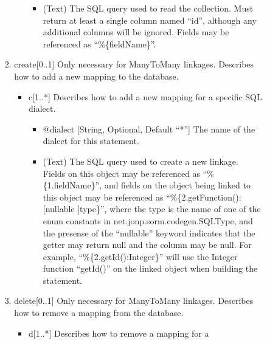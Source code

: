 \documentclass{book}
\begin{document}
\begin{enumerate}
\begin{enumerate}
\begin{enumerate}
\begin{enumerate}
\begin{itemize}
\begin{itemize}
                        \item (Text) The SQL query used to read the collection.
                              Must return at least a single column named ``id'',
                              although any additional columns will be ignored.
                              Fields may be referenced as ``\%\{fieldName\}''.
                    \end{itemize}
                \end{itemize}
                \item create[0..1] Only necessary for ManyToMany linkages.
                      Describes how to add a new mapping to the database.
                \begin{itemize}
                    \item c[1..*] Describes how to add a new mapping for a
                          specific SQL dialect.
                    \begin{itemize}
                        \item @dialect [String, Optional, Default ``*''] The
                              name of the dialect for this statement.
                        \item (Text) The SQL query used to create a new linkage.
                              Fields on this object may be referenced as
                              ``\%\{1.fieldName\}'', and fields on the object
                              being linked to this object may be referenced as
                              ``\%\{2.getFunction():[nullable ]type\}'', where
                              the type is the name of one of the enum constants
                              in net.jonp.sorm.codegen.SQLType, and the presense
                              of the ``nullable'' keyword indicates that the
                              getter may return null and the column may be null.
                              For example, ``\%\{2.getId():Integer\}'' will use
                              the Integer function ``getId()'' on the linked
                              object when building the statement.
                    \end{itemize}
                \end{itemize}
                \item delete[0..1] Only necessary for ManyToMany linkages.
                      Describes how to remove a mapping from the database.
                \begin{itemize}
                    \item d[1..*] Describes how to remove a mapping for a

\end{itemize}
\end{enumerate}
\end{enumerate}
\end{enumerate}
\end{enumerate}
\end{document}

